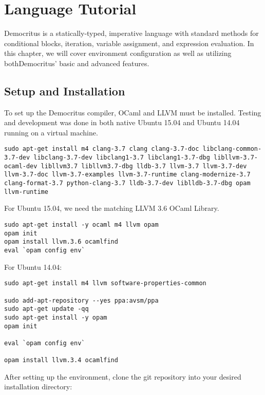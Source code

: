 \chapter{Language Tutorial}

Democritus is a statically-typed, imperative language with standard methods for conditional blocks, iteration, variable assignment, and expression evaluation. In this chapter, we will cover environment configuration as well as utilizing bothDemocritus' basic and advanced features.

\section{Setup and Installation}

	To set up the Democritus compiler, OCaml and LLVM must be installed. Testing and development was done in both native Ubuntu 15.04 and Ubuntu 14.04 running on a virtual machine.

	\begin{lstlisting}
sudo apt-get install m4 clang-3.7 clang clang-3.7-doc libclang-common-3.7-dev libclang-3.7-dev libclang1-3.7 libclang1-3.7-dbg libllvm-3.7-ocaml-dev libllvm3.7 libllvm3.7-dbg lldb-3.7 llvm-3.7 llvm-3.7-dev llvm-3.7-doc llvm-3.7-examples llvm-3.7-runtime clang-modernize-3.7 clang-format-3.7 python-clang-3.7 lldb-3.7-dev liblldb-3.7-dbg opam llvm-runtime
	\end{lstlisting}

	\medskip \noindent For Ubuntu 15.04, we need the matching LLVM 3.6 OCaml Library.

	\begin{lstlisting}
sudo apt-get install -y ocaml m4 llvm opam
opam init
opam install llvm.3.6 ocamlfind
eval `opam config env`
\end{lstlisting}

	\medskip \noindent For Ubuntu 14.04:

	\begin{lstlisting}
sudo apt-get install m4 llvm software-properties-common

sudo add-apt-repository --yes ppa:avsm/ppa
sudo apt-get update -qq
sudo apt-get install -y opam
opam init

eval `opam config env`

opam install llvm.3.4 ocamlfind
	\end{lstlisting}

	\medskip \noindent After setting up the environment, clone the git repository into your desired installation directory:

